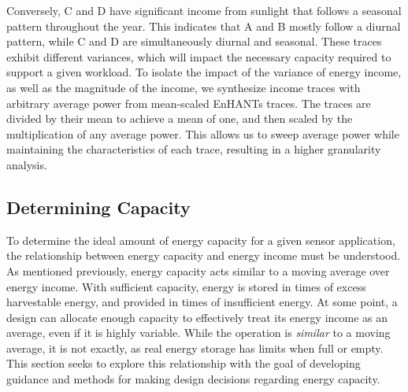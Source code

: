 Conversely, C and D have significant income from sunlight that follows a seasonal pattern throughout the year.
This indicates that A and B mostly follow a diurnal pattern, while C and D are simultaneously diurnal and seasonal.
These traces exhibit different variances, which will impact the necessary capacity required to support a given workload.
To isolate the impact of the variance of energy income, as well as the magnitude of the income, we synthesize income traces with arbitrary average power from mean-scaled EnHANTs traces. The traces are divided by their mean to achieve a mean of one, and then scaled by the multiplication of any average power.
This allows us to sweep average power while maintaining the characteristics of each trace, resulting in a higher granularity analysis.


\subsection{Determining Capacity}
To determine the ideal amount of energy capacity for a given sensor application, the relationship between energy capacity and energy income must be understood.
As mentioned previously, energy capacity acts similar to a moving average over energy income. With sufficient capacity, energy is stored in times of excess harvestable energy, and provided in times of insufficient energy.
At some point, a design can allocate enough capacity to effectively treat its energy income as an average, even if it is highly variable.
While the operation is \textit{similar} to a moving average, it is not exactly, as real energy storage has limits when full or empty.
This section seeks to explore this relationship with the goal of developing guidance and methods for making design decisions regarding energy capacity. 

